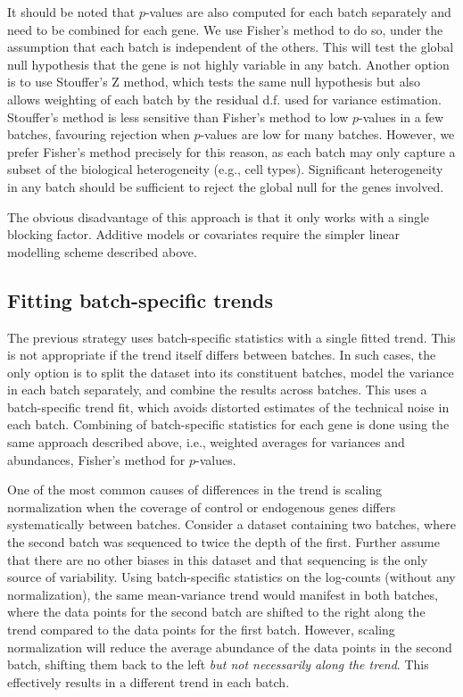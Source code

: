 \documentclass{article}
\begin{document}
It should be noted that $p$-values are also computed for each batch separately and need to be combined for each gene.
We use Fisher's method to do so, under the assumption that each batch is independent of the others.
This will test the global null hypothesis that the gene is not highly variable in any batch.
Another option is to use Stouffer's Z method, which tests the same null hypothesis but also allows weighting of each batch by the residual d.f. used for variance estimation.
Stouffer's method is less sensitive than Fisher's method to low $p$-values in a few batches, favouring rejection when $p$-values are low for many batches.
However, we prefer Fisher's method precisely for this reason, as each batch may only capture a subset of the biological heterogeneity (e.g., cell types).
Significant heterogeneity in any batch should be sufficient to reject the global null for the genes involved.

The obvious disadvantage of this approach is that it only works with a single blocking factor.
Additive models or covariates require the simpler linear modelling scheme described above.

\subsection{Fitting batch-specific trends}
The previous strategy uses batch-specific statistics with a single fitted trend.
This is not appropriate if the trend itself differs between batches.
In such cases, the only option is to split the dataset into its constituent batches, model the variance in each batch separately, and combine the results across batches.
This uses a batch-specific trend fit, which avoids distorted estimates of the technical noise in each batch.
Combining of batch-specific statistics for each gene is done using the same approach described above, i.e., weighted averages for variances and abundances, Fisher's method for $p$-values.

One of the most common causes of differences in the trend is scaling normalization when the coverage of control or endogenous genes differs systematically between batches.
Consider a dataset containing two batches, where the second batch was sequenced to twice the depth of the first.
Further assume that there are no other biases in this dataset and that sequencing is the only source of variability. 
Using batch-specific statistics on the log-counts (without any normalization), the same mean-variance trend would manifest in both batches,
where the data points for the second batch are shifted to the right along the trend compared to the data points for the first batch.
However, scaling normalization will reduce the average abundance of the data points in the second batch,
shifting them back to the left \textit{but not necessarily along the trend}.
This effectively results in a different trend in each batch.
\end{document}

